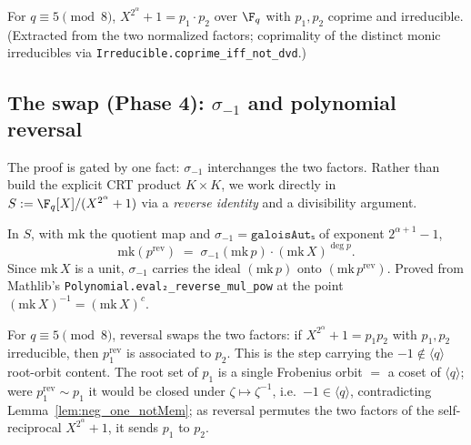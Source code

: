\begin{lemma}\label{lem:factorization}
\leanok
{}
For $q \equiv 5 \pmod 8$, $X^{2^\alpha}+1 = p_1 \cdot p_2$ over $\F_q$ with $p_1, p_2$ coprime and
irreducible. (Extracted from the two normalized factors; coprimality of the distinct monic
irreducibles via \texttt{Irreducible.coprime\_iff\_not\_dvd}.)
\end{lemma}

\subsection{The swap (Phase 4): \texorpdfstring{$\sigma_{-1}$}{σ(-1)} and polynomial reversal}

The proof is gated by one fact: $\sigma_{-1}$ interchanges the two factors. Rather than build the
explicit CRT product $K \times K$, we work directly in $S := \F_q[X]/(X^{2^\alpha}+1)$ via a
\emph{reverse identity} and a divisibility argument.

\begin{lemma}\label{lem:conj_reverse}
\leanok
In $S$, with $\mathrm{mk}$ the quotient map and $\sigma_{-1} = \texttt{galoisAutₛ}$ of exponent
$2^{\alpha+1}-1$,
\[
  \mathrm{mk}(p^{\mathrm{rev}}) \;=\; \sigma_{-1}(\mathrm{mk}\,p)\cdot(\mathrm{mk}\,X)^{\deg p}.
\]
Since $\mathrm{mk}\,X$ is a unit, $\sigma_{-1}$ carries the ideal $(\mathrm{mk}\,p)$ onto
$(\mathrm{mk}\,p^{\mathrm{rev}})$. Proved from Mathlib's
\texttt{Polynomial.eval₂\_reverse\_mul\_pow} at the point $(\mathrm{mk}\,X)^{-1} = (\mathrm{mk}\,X)^{c}$.
\end{lemma}

\begin{lemma}\label{lem:no_selfReciprocal}
\leanok
{}
For $q \equiv 5 \pmod 8$, reversal swaps the two factors: if $X^{2^\alpha}+1 = p_1 p_2$ with
$p_1, p_2$ irreducible, then
$p_1^{\mathrm{rev}}$ is associated to $p_2$. This is the step carrying the
$-1 \notin \langle q\rangle$ root-orbit content. The root set of $p_1$ is a single Frobenius orbit $=$ a
coset of $\langle q\rangle$; were $p_1^{\mathrm{rev}} \sim p_1$ it would be closed under $\zeta
\mapsto \zeta^{-1}$, i.e.\ $-1 \in \langle q\rangle$, contradicting Lemma~\ref{lem:neg_one_notMem};
as reversal permutes the two factors of the self-reciprocal $X^{2^\alpha}+1$, it sends $p_1$ to $p_2$.
\end{lemma}

